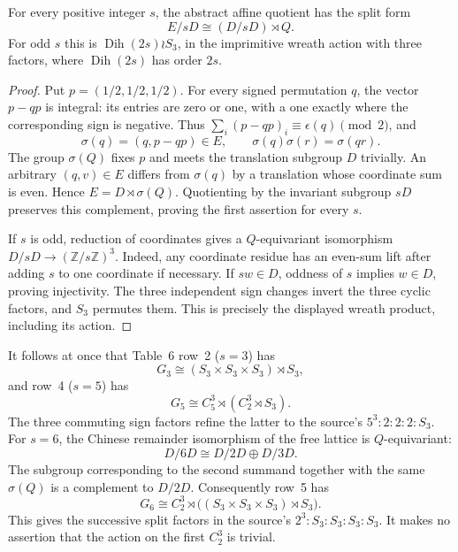\documentclass[11pt]{article}
\newcommand{\C}{C}\newcommand{\Z}{\mathbb Z}
\begin{document}
\begin{lemma}\label{lem:split}
For every positive integer $s$, the abstract affine quotient has the
split form
\[
 E/sD\cong (D/sD)\rtimes Q.
\]
For odd $s$ this is $\operatorname{Dih}(2s)\wr S_3$, in the imprimitive
wreath action with three factors, where $\operatorname{Dih}(2s)$ has
order $2s$.
\end{lemma}
\begin{proof}
Put $p=(1/2,1/2,1/2)$. For every signed permutation $q$, the vector
$p-qp$ is integral: its entries are zero or one, with a one exactly
where the corresponding sign is negative. Thus
$\sum_i(p-qp)_i\equiv\epsilon(q)\pmod2$, and
\[
 \sigma(q)=(q,p-qp)\in E,\qquad \sigma(q)\sigma(r)=\sigma(qr).
\]
The group $\sigma(Q)$ fixes $p$ and meets the translation subgroup $D$
trivially. An arbitrary $(q,v)\in E$ differs from $\sigma(q)$ by a
translation whose coordinate sum is even. Hence
$E=D\rtimes\sigma(Q)$. Quotienting by the invariant subgroup $sD$
preserves this complement, proving the first assertion for every $s$.

If $s$ is odd, reduction of coordinates gives a $Q$-equivariant
isomorphism $D/sD\longrightarrow(\Z/s\Z)^3$. Indeed, any coordinate
residue has an even-sum lift after adding $s$ to one coordinate if
necessary. If $sw\in D$, oddness of $s$ implies $w\in D$, proving
injectivity. The three independent sign changes invert the three cyclic
factors, and $S_3$ permutes them. This is precisely the displayed wreath
product, including its action.
\end{proof}

It follows at once that Table~6 row~2 ($s=3$) has
\[
 G_3\cong(S_3\times S_3\times S_3)\rtimes S_3,
\]
and row~4 ($s=5$) has
\[
 G_5\cong\C_5^3\rtimes(\C_2^3\rtimes S_3).
\]
The three commuting sign factors refine the latter to the source's
$5^3:2:2:2:S_3$. For $s=6$, the Chinese remainder isomorphism of the
free lattice is $Q$-equivariant:
\[
 D/6D\cong D/2D\oplus D/3D.
\]
The subgroup corresponding to the second summand together with the
same $\sigma(Q)$ is a complement to $D/2D$. Consequently row~5 has
\[
 G_6\cong\C_2^3\rtimes\bigl((S_3\times S_3\times S_3)\rtimes S_3\bigr).
\]
This gives the successive split factors in the source's
$2^3:S_3:S_3:S_3:S_3$. It makes no assertion that the action on the
first $\C_2^3$ is trivial.
\end{document}
